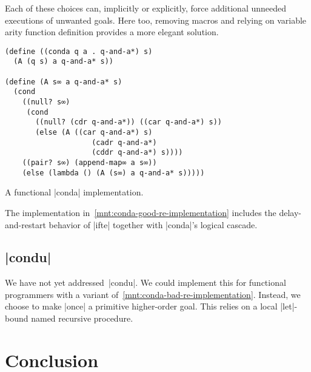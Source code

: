 \documentclass[sigplan,screen,draft,anonymous,review,natbib=false]{acmart}
\begin{document}
Each of these choices can, implicitly or explicitly, force additional
unneeded executions of unwanted goals. Here too, removing macros and
relying on variable arity function definition provides a more elegant
solution.

\begin{listing}
  \begin{verbatim}
(define ((conda q a . q-and-a*) s)
  (A (q s) a q-and-a* s))

(define (A s∞ a q-and-a* s)
  (cond
    ((null? s∞)
     (cond
       ((null? (cdr q-and-a*)) ((car q-and-a*) s))
       (else (A ((car q-and-a*) s)
                    (cadr q-and-a*)
                    (cddr q-and-a*) s))))
    ((pair? s∞) (append-map∞ a s∞))
    (else (lambda () (A (s∞) a q-and-a* s)))))
  \end{verbatim}
  \caption{A functional \rackinline|conda| implementation.}
  \label{mnt:conda-good-re-implementation}
\end{listing}

The implementation in~\cref{mnt:conda-good-re-implementation} includes
the delay-and-restart behavior of \rackinline|ifte| together with
\rackinline|conda|'s logical cascade.

\subsection{\rackinline|condu|}

We have not yet addressed~\rackinline|condu|. We could implement this
for functional programmers with a variant
of~\cref{mnt:conda-bad-re-implementation}. Instead, we choose to make
\rackinline|once| a primitive higher-order goal. This relies on a
local \rackinline|let|-bound named recursive procedure.


\section{Conclusion}\label{sec:conclusion}
\end{document}
